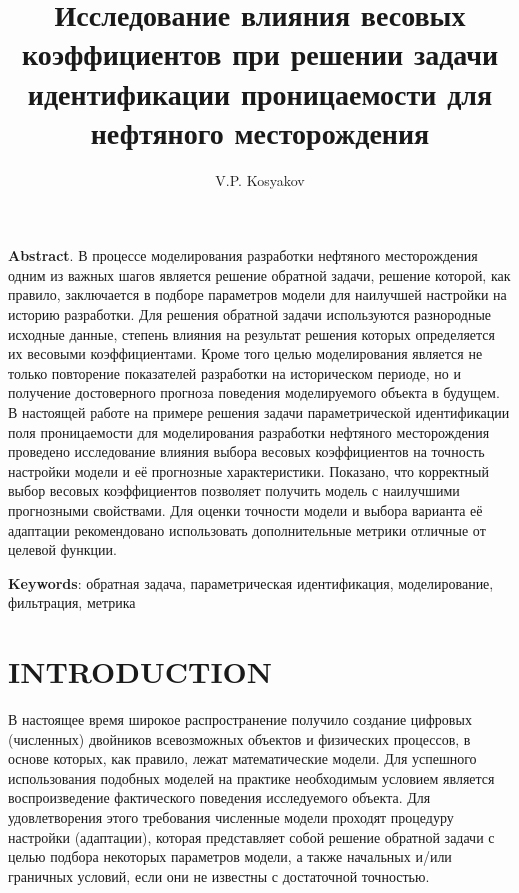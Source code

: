 \documentclass{article}
\title{Исследование влияния весовых коэффициентов при решении задачи идентификации проницаемости для нефтяного месторождения}
\author{V.P. Kosyakov}
\begin{document}
	\maketitle
	\textbf{Abstract}. В процессе моделирования разработки нефтяного месторождения одним из важных шагов является решение обратной задачи, решение которой, как правило, заключается в подборе параметров модели для наилучшей настройки на историю разработки. Для решения обратной задачи используются разнородные исходные данные, степень влияния на результат решения которых определяется их весовыми коэффициентами. Кроме того целью моделирования является не только повторение показателей разработки на историческом периоде, но и получение достоверного прогноза поведения моделируемого объекта в будущем. 
	В настоящей  работе на примере решения задачи параметрической идентификации поля проницаемости для моделирования разработки нефтяного месторождения проведено исследование влияния выбора весовых коэффициентов на точность настройки модели и её прогнозные характеристики. Показано, что корректный выбор весовых коэффициентов позволяет получить модель с наилучшими прогнозными свойствами. Для оценки точности модели и выбора варианта её адаптации рекомендовано использовать дополнительные метрики отличные от целевой функции.

\textbf{Keywords}: обратная задача, параметрическая идентификация, моделирование, фильтрация, метрика

\section{INTRODUCTION}
	В настоящее время широкое распространение получило создание цифровых (численных) двойников всевозможных объектов и физических процессов, в основе которых, как правило, лежат математические модели. Для успешного использования подобных моделей на практике необходимым условием является воспроизведение фактического поведения исследуемого объекта. Для удовлетворения этого требования численные модели проходят процедуру настройки (адаптации), которая представляет собой решение обратной задачи с целью подбора некоторых параметров модели, а также начальных и/или граничных условий, если они не известны с достаточной точностью. 
	
\end{document}
